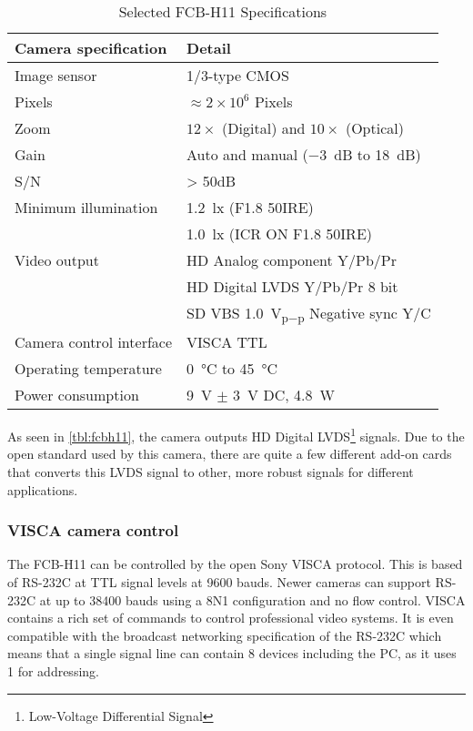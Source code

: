 \begin{table}[htbp]
	\centering
	\begin{tabular}{ll}
	
		\toprule
			Camera specification 	& Detail \\
		\midrule
			Image sensor 			& 1/3-type CMOS \\
			Pixels 					& $\approx2\times10^{6}$ Pixels \\
			Zoom 					& $12\times$ (Digital) and $10\times$ (Optical) \\
			Gain 					& Auto and manual (\SI{-3}{\deci\bel} to \SI{18}{\deci\bel}) \\
			S/N						& > 50dB \\
			Minimum illumination 	& \SI{1.2}{\lux} (F1.8 50IRE) \\
									& \SI{1.0}{\lux} (ICR ON F1.8 50IRE) \\
			Video output			& HD Analog component Y/Pb/Pr \\
									& HD Digital LVDS Y/Pb/Pr 8 bit \\
									& SD VBS \SI{1.0}{\volt_{p-p}} Negative sync Y/C \\
			Camera control interface& VISCA TTL \\
			Operating temperature	& \SI{0}{\celsius} to \SI{45}{\celsius} \\
			Power consumption		& \SI{9}{\volt} $\pm$ \SI{3}{\volt} DC, \SI{4.8}{\watt} \\
		\bottomrule
	\end{tabular}
	\caption{Selected FCB-H11 Specifications}
	\label{tbl:fcbh11}
\end{table}


As seen in \vref{tbl:fcbh11}, the camera outputs HD Digital LVDS\footnote{Low-Voltage Differential Signal} signals.
Due to the open standard used by this camera, there are quite a few different add-on cards that 
converts this LVDS signal to other, more robust signals for different applications.

\subsubsection{VISCA camera control}\label{sec:visca}
The FCB-H11 can be controlled by the open Sony VISCA protocol. This is based of RS-232C at TTL signal levels
at 9600 bauds. Newer cameras can support RS-232C at up to 38400 bauds using a 8N1 configuration and no flow control. 
VISCA contains a rich set of commands to control professional video systems. It is even compatible with 
the broadcast networking specification of the RS-232C which means that a single signal line can contain 
8 devices including the PC, as it uses \SI{1}{\byte} for addressing.

